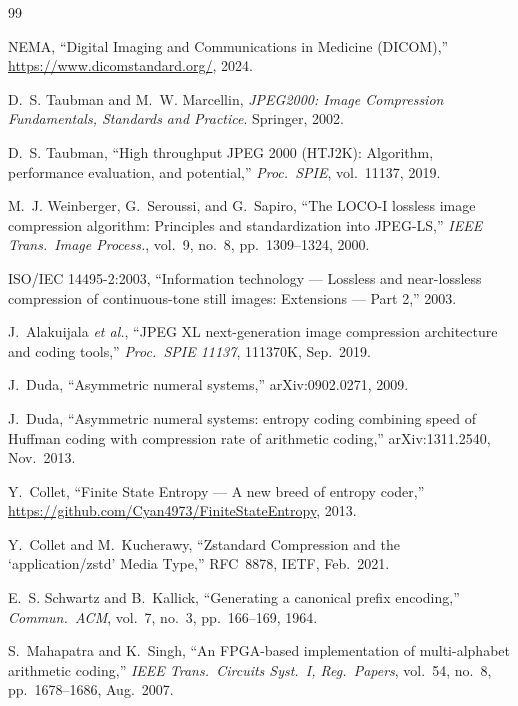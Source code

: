 \documentclass[10pt,twocolumn]{article}
\begin{document}

\begin{thebibliography}{99}

NEMA, ``Digital Imaging and Communications in Medicine (DICOM),''
\url{https://www.dicomstandard.org/}, 2024.

D.~S. Taubman and M.~W. Marcellin, \textit{JPEG2000: Image Compression
Fundamentals, Standards and Practice}. Springer, 2002.

D.~S. Taubman, ``High throughput JPEG 2000 (HTJ2K): Algorithm, performance
evaluation, and potential,'' \textit{Proc.\ SPIE}, vol.~11137, 2019.

M.~J. Weinberger, G.~Seroussi, and G.~Sapiro, ``The LOCO-I lossless image
compression algorithm: Principles and standardization into JPEG-LS,''
\textit{IEEE Trans.\ Image Process.}, vol.~9, no.~8, pp.~1309--1324, 2000.

ISO/IEC 14495-2:2003, ``Information technology --- Lossless and near-lossless
compression of continuous-tone still images: Extensions --- Part 2,'' 2003.

J.~Alakuijala \textit{et al.}, ``JPEG XL next-generation image compression
architecture and coding tools,'' \textit{Proc.\ SPIE 11137}, 111370K,
Sep.~2019.

J.~Duda, ``Asymmetric numeral systems,'' arXiv:0902.0271, 2009.

J.~Duda, ``Asymmetric numeral systems: entropy coding combining speed of
Huffman coding with compression rate of arithmetic coding,''
arXiv:1311.2540, Nov.~2013.

Y.~Collet, ``Finite State Entropy --- A new breed of entropy coder,''
\url{https://github.com/Cyan4973/FiniteStateEntropy}, 2013.

Y.~Collet and M.~Kucherawy, ``Zstandard Compression and the
`application/zstd' Media Type,'' RFC~8878, IETF, Feb.~2021.

E.~S. Schwartz and B.~Kallick, ``Generating a canonical prefix encoding,''
\textit{Commun.\ ACM}, vol.~7, no.~3, pp.~166--169, 1964.

S.~Mahapatra and K.~Singh, ``An FPGA-based implementation of multi-alphabet
arithmetic coding,'' \textit{IEEE Trans.\ Circuits Syst.\ I, Reg.\ Papers},
vol.~54, no.~8, pp.~1678--1686, Aug.~2007.


\end{thebibliography}
\end{document}
